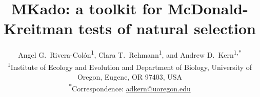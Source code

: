 \documentclass[11pt]{article}
\begin{document}
\title{MKado: a toolkit for McDonald-Kreitman tests of natural selection}
\author{Angel G.\ Rivera-Col\'{o}n\textsuperscript{1},
  Clara T.\ Rehmann\textsuperscript{1},
  and Andrew D.\ Kern\textsuperscript{1,*}\\[4pt]
  \small\textsuperscript{1}Institute of Ecology and Evolution and Department of Biology,
  University of Oregon, Eugene, OR 97403, USA\\
  \small\textsuperscript{*}Correspondence: \href{mailto:adkern@uoregon.edu}{adkern@uoregon.edu}}
\date{}

\maketitle













\pagebreak

\end{document}
